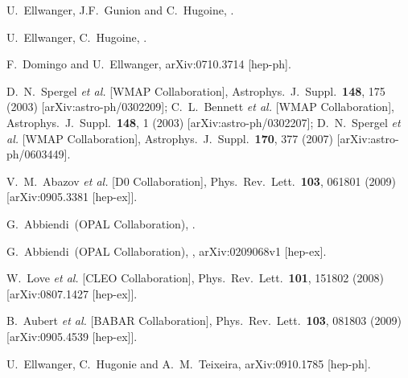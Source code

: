 \documentclass[aps,prl,twocolumn,nofootinbib,superscriptaddress]{revtex4}
\begin{document}
{\begin{thebibliography}{99}
 U.~Ellwanger, J.F.~Gunion and C.~Hugoine,
.

 U.~Ellwanger, C.~Hugoine, .

 F.~Domingo and U.~Ellwanger, arXiv:0710.3714 [hep-ph].

  D.~N.~Spergel {\it et al.}  [WMAP Collaboration],
  Astrophys.\ J.\ Suppl.\  {\bf 148}, 175 (2003)
  [arXiv:astro-ph/0302209];
%
  C.~L.~Bennett {\it et al.}  [WMAP Collaboration],
  Astrophys.\ J.\ Suppl.\  {\bf 148}, 1 (2003)
  [arXiv:astro-ph/0302207];
%
  D.~N.~Spergel {\it et al.}  [WMAP Collaboration],
  Astrophys.\ J.\ Suppl.\  {\bf 170}, 377 (2007)
  [arXiv:astro-ph/0603449].  

  V.~M.~Abazov {\it et al.}  [D0 Collaboration],
  Phys.\ Rev.\ Lett.\  {\bf 103}, 061801 (2009)
  [arXiv:0905.3381 [hep-ex]].

 G.~Abbiendi~\etal (OPAL Collaboration),
.

 G.~Abbiendi~\etal (OPAL Collaboration),
, arXiv:0209068v1 [hep-ex].

  W.~Love {\it et al.}  [CLEO Collaboration],
  Phys.\ Rev.\ Lett.\  {\bf 101}, 151802 (2008)
  [arXiv:0807.1427 [hep-ex]].

  B.~Aubert {\it et al.}  [BABAR Collaboration],
  Phys.\ Rev.\ Lett.\  {\bf 103}, 081803 (2009)
  [arXiv:0905.4539 [hep-ex]].

  U.~Ellwanger, C.~Hugonie and A.~M.~Teixeira,
  arXiv:0910.1785 [hep-ph].


\end{thebibliography}}
\end{document}
